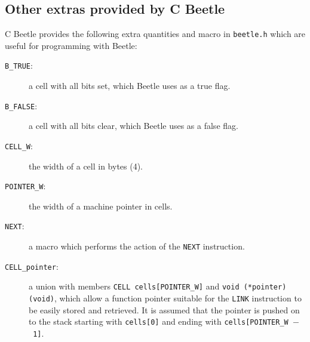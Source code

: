 \documentclass[english]{article}
\begin{document}
\subsection{Other extras provided by C Beetle}

C Beetle provides the following extra quantities and macro in {\tt beetle.h}
which are useful for programming with Beetle:

\begin{description}
\item[{\tt B\_TRUE}:] a cell with all bits set, which Beetle uses as a true
flag.
\item[{\tt B\_FALSE}:] a cell with all bits clear, which Beetle uses as a
false flag.
\item[{\tt CELL\_W}:] the width of a cell in bytes (4).
\item[{\tt POINTER\_W}:] the width of a machine pointer in cells.
\item[{\tt NEXT}:] a macro which performs the action of the {\tt NEXT}
instruction.
\item[{\tt CELL\_pointer}:] a union with members {\tt CELL cells[POINTER\_W]} and {\tt void (*pointer)(void)}, which allow a function pointer suitable for the {\tt LINK} instruction to be easily stored and retrieved. It is assumed that the pointer is pushed on to the stack starting with {\tt cells[0]} and ending with {\tt cells[POINTER\_W~$-$~1]}.
\end{description}




\end{document}
